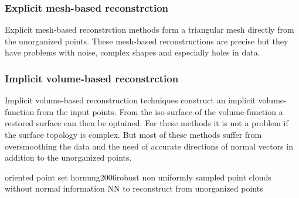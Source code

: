 \subsubsection{Explicit mesh-based reconstrction}
Explicit mesh-based reconstrction methods form a triangular mesh directly from
the unorganized points. These mesh-based reconstructions are precise but they
have problems with noise, complex shapes and especially holes in data.
\subsubsection{Implicit volume-based reconstrction}
Implicit volume-based reconstruction techniques construct an implicit
volume-function from the input points. From the iso-surface of the
volume-function a restored surface can then be optained. For these methods it is
not a problem if the surface topology is complex. But most of these methods
suffer from oversmoothing the data and the need of accurate directions of normal
vectors in addition to the unorganized points. 


\cite{kazhdan2005reconstruction} oriented point set hornung2006robust
\cite{hornung2006robust} non uniformly sampled point clouds without normal information
\cite{yu1999surface} NN to reconstruct from unorganized points





\endinput
